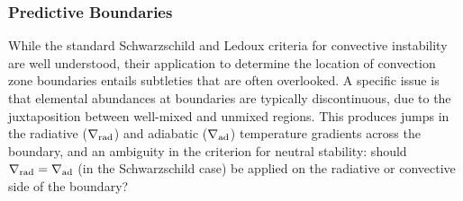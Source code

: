 \subsubsection{Predictive Boundaries}

While the standard Schwarzschild and Ledoux criteria for convective instability are well understood, their application to determine the location of convection zone boundaries entails subtleties that are often overlooked. A specific issue is that elemental abundances at boundaries are typically discontinuous, due to the juxtaposition between well-mixed and unmixed regions. This produces jumps in the radiative ($\nabla_{\rm rad}$) and adiabatic ($\nabla_{\rm ad}$) temperature gradients across the boundary, and an ambiguity in the criterion for neutral stability: should $\nabla_{\rm rad}=\nabla_{\rm ad}$ (in the Schwarzschild case) be applied on the radiative or convective side of the boundary?

